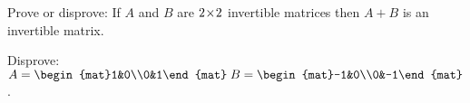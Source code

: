 
\begin{Exercise}[
name={},
title={}, 
difficulty=0,
origin={\cite{GH}}]
Prove or disprove: If $A$ and $B$ are $2 \! \times \! 2$ invertible matrices then $A+B$ is an invertible matrix.

\end{Exercise}
\begin{Answer}
Disprove: $A=\begin{mat}1&0\\0&1\end{mat}\;B=\begin{mat}-1&0\\0&-1\end{mat}$.
\end{Answer}
